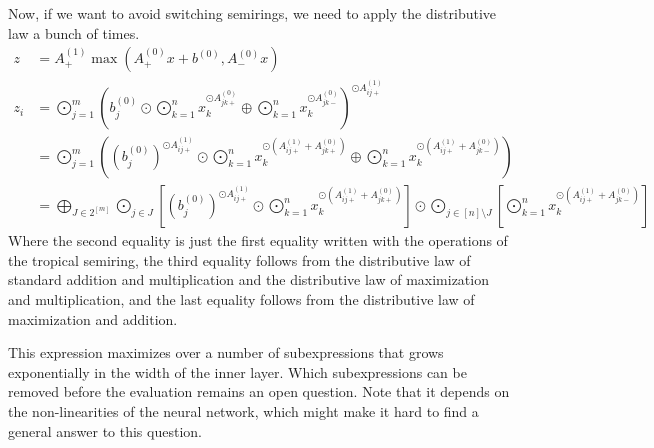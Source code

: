Now, if we want to avoid switching semirings, we need to apply the distributive law a bunch of times.
\begin{align*}
    z   & = A^{(1)}_+ \max(A^{(0)}_+ x + b^{(0)}, A^{(0)}_- x)                                                                                                                                                                                                                                                                                                          \\
    z_i & = \bigodot\limits_{j = 1}^{m}\left(b^{(0)}_j \odot \bigodot\limits_{k = 1}^{n} x_k^{\odot A^{(0)}_{jk+}} \oplus \bigodot\limits_{k = 1}^{n} x_k^{\odot A^{(0)}_{jk-}}\right)^{\odot A^{(1)}_{ij+}}                                                                                                                                                            \\
        & = \bigodot\limits_{j = 1}^{m}\left(\left(b^{(0)}_j\right)^{\odot A^{(1)}_{ij+}} \odot \bigodot\limits_{k = 1}^{n} x_k^{\odot \left(A^{(1)}_{ij+} + A^{(0)}_{jk+}\right)} \oplus \bigodot\limits_{k = 1}^{n} x_k^{\odot \left(A^{(1)}_{ij+} + A^{(0)}_{jk-}\right)}\right)                                                                                     \\
        & = \bigoplus\limits_{J \in 2^{[m]}} \bigodot\limits_{j \in J} \left[\left(b^{(0)}_j\right)^{\odot A^{(1)}_{ij+}} \odot \bigodot\limits_{k = 1}^{n} x_k^{\odot \left(A^{(1)}_{ij+} + A^{(0)}_{jk+}\right)}\right] \odot \bigodot\limits_{j \in [n] \setminus J} \left[\bigodot\limits_{k = 1}^{n} x_k^{\odot \left(A^{(1)}_{ij+} + A^{(0)}_{jk-}\right)}\right]
\end{align*}
Where the second equality is just the first equality written with the operations of the tropical semiring,
the third equality follows from the distributive law of standard addition and multiplication and the distributive law of maximization and multiplication,
and the last equality follows from the distributive law of maximization and addition.

This expression maximizes over a number of subexpressions that grows exponentially in the width of the inner layer.
Which subexpressions can be removed before the evaluation remains an open question.
Note that it depends on the non-linearities of the neural network, which might make it hard to find a general answer to this question.

